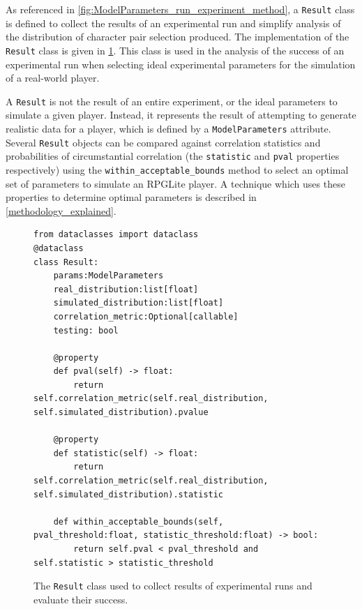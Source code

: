 As referenced in \cref{fig:ModelParameters_run_experiment_method}, a
\lstinline{Result} class is defined to collect the results of an experimental
run and simplify analysis of the distribution of character pair selection
produced. The implementation of the \lstinline{Result} class is given in
\cref{fig:Result_class}. This class is used in the analysis of the success of an
experimental run when selecting ideal experimental parameters for the simulation
of a real-world player.

A \lstinline{Result} is not the result of an entire experiment, or the ideal
parameters to simulate a given player. Instead, it represents the result of
attempting to generate realistic data for a player, which is defined by a
\lstinline{ModelParameters} attribute. Several \lstinline{Result} objects can be
compared against correlation statistics and probabilities of circumstantial correlation
(the \lstinline{statistic} and \lstinline{pval} properties respectively) using
the \lstinline{within_acceptable_bounds} method to
select an optimal set of parameters to simulate an RPGLite player. A technique
which uses these properties to determine optimal parameters is described in
\cref{methodology_explained}.


\begin{figure}[tp]
  \begin{center}
    \begin{lstlisting}[style=footnotesize_python]
from dataclasses import dataclass
@dataclass
class Result:
    params:ModelParameters
    real_distribution:list[float]
    simulated_distribution:list[float]
    correlation_metric:Optional[callable]
    testing: bool

    @property
    def pval(self) -> float:
        return self.correlation_metric(self.real_distribution, self.simulated_distribution).pvalue

    @property
    def statistic(self) -> float:
        return self.correlation_metric(self.real_distribution, self.simulated_distribution).statistic

    def within_acceptable_bounds(self, pval_threshold:float, statistic_threshold:float) -> bool:
        return self.pval < pval_threshold and self.statistic > statistic_threshold
    \end{lstlisting}
  \end{center}
  \caption{The \lstinline{Result} class used to collect results of experimental
  runs and evaluate their success.}
  \label{fig:Result_class}
\end{figure}


